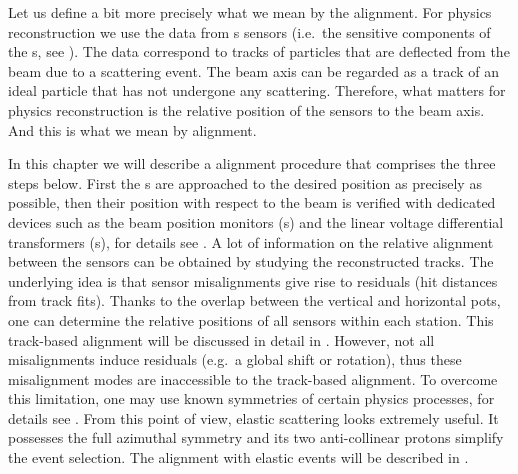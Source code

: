 \vskip-1mm
Let us define a bit more precisely what we mean by the  alignment. For physics reconstruction we use the data from s sensors (i.e.~the sensitive components of the s, see ). The data correspond to tracks of particles that are deflected from the beam due to a scattering event. The beam axis can be regarded as a track of an ideal particle that has not undergone any scattering. Therefore, what matters for physics reconstruction is the relative position of the  sensors to the beam axis. And this is what we mean by  alignment.


In this chapter we will describe a  alignment procedure that comprises the three steps below.
\bitm
\itm First the s are approached to the desired position as precisely as possible, then their position with respect to the beam is verified  with dedicated devices such as the beam position monitors (s) and the linear voltage differential transformers (s), for details see .
\itm A lot of information on the relative alignment between the  sensors can be obtained by studying the reconstructed tracks. The underlying idea is that sensor misalignments give rise to residuals (hit distances from track fits). Thanks to the overlap between the vertical and horizontal pots, one can determine the relative positions of all  sensors within each station. This track-based alignment will be discussed in detail in .
\itm However, not all misalignments induce residuals (e.g.~a global shift or rotation), thus these misalignment modes are inaccessible to the track-based alignment. To overcome this limitation, one may use known symmetries of certain physics processes, for details see . From this point of view, elastic scattering looks extremely useful. It possesses the full azimuthal symmetry and its two anti-collinear protons simplify the event selection. The alignment with elastic events will be described in .
\eitm

